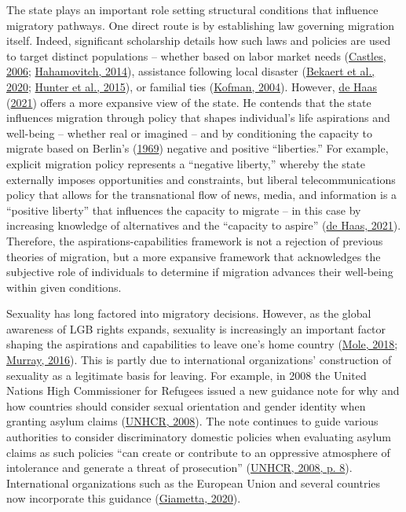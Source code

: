 \documentclass[
  11pt,
]{article}
\begin{document}
The state plays an important role setting structural conditions that influence migratory pathways. One direct route is by establishing law governing migration itself. Indeed, significant scholarship details how such laws and policies are used to target distinct populations -- whether based on labor market needs (\protect\hyperlink{ref-castles_2006}{Castles, 2006}; \protect\hyperlink{ref-hahamovitch_2014}{Hahamovitch, 2014}), assistance following local disaster (\protect\hyperlink{ref-bekaert_2020}{Bekaert et al., 2020}; \protect\hyperlink{ref-hunter_2015}{Hunter et al., 2015}), or familial ties (\protect\hyperlink{ref-kofman_2004_family}{Kofman, 2004}). However, \protect\hyperlink{ref-dehaas_2021}{de Haas} (\protect\hyperlink{ref-dehaas_2021}{2021}) offers a more expansive view of the state. He contends that the state influences migration through policy that shapes individual's life aspirations and well-being -- whether real or imagined -- and by conditioning the capacity to migrate based on Berlin's (\protect\hyperlink{ref-berlin_1969_four}{1969}) negative and positive ``liberties.'' For example, explicit migration policy represents a ``negative liberty,'' whereby the state externally imposes opportunities and constraints, but liberal telecommunications policy that allows for the transnational flow of news, media, and information is a ``positive liberty'' that influences the capacity to migrate -- in this case by increasing knowledge of alternatives and the ``capacity to aspire'' (\protect\hyperlink{ref-dehaas_2021}{de Haas, 2021}). Therefore, the aspirations-capabilities framework is not a rejection of previous theories of migration, but a more expansive framework that acknowledges the subjective role of individuals to determine if migration advances their well-being within given conditions.

Sexuality has long factored into migratory decisions. However, as the global awareness of LGB rights expands, sexuality is increasingly an important factor shaping the aspirations and capabilities to leave one's home country (\protect\hyperlink{ref-mole_2018a}{Mole, 2018}; \protect\hyperlink{ref-murray_2016}{Murray, 2016}). This is partly due to international organizations' construction of sexuality as a legitimate basis for leaving. For example, in 2008 the United Nations High Commissioner for Refugees issued a new guidance note for why and how countries should consider sexual orientation and gender identity when granting asylum claims (\protect\hyperlink{ref-unhcr_2008}{UNHCR, 2008}). The note continues to guide various authorities to consider discriminatory domestic policies when evaluating asylum claims as such policies ``can create or contribute to an oppressive atmosphere of intolerance and generate a threat of prosecution'' (\protect\hyperlink{ref-unhcr_2008}{UNHCR, 2008, p. 8}). International organizations such as the European Union and several countries now incorporate this guidance (\protect\hyperlink{ref-giametta_2020}{Giametta, 2020}).
\end{document}
